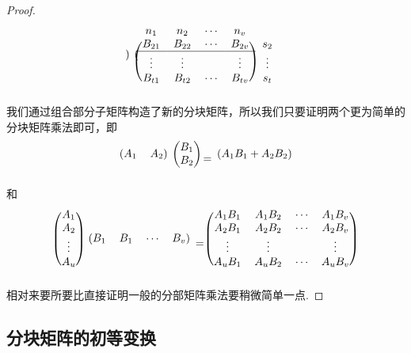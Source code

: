 \documentclass{article}
\begin{document}
\begin{proof}
$$\begin{array}{ll}
\begin{blockarray}{cccc}
\begin{block}{c(c|cc)}
\end{block} 
\end{blockarray}~
\begin{blockarray}{ccccc}
n_1    & n_2    & \cdots & n_v  &\\
\begin{block}{(cccc)c}
B_{21} & B_{22} & \cdots & B_{2v} & s_2 \\
\BAhhline{----}
\vdots & \vdots & 		 & \vdots & \vdots \\
B_{t1} & B_{t2} & \cdots & B_{tv} & s_t \\
\end{block}
\end{blockarray}
\end{array}
$$
我们通过组合部分子矩阵构造了新的分块矩阵，所以我们只要证明两个更为简单的分块矩阵乘法即可，即
$$
\begin{blockarray}{(cc)}
A_1 & A_2
\end{blockarray} ~
\begin{blockarray}{(c)}
B_1 \\
B_2 \\
\end{blockarray}
= \begin{blockarray}{(c)}
A_1B_1 + A_2B_2
\end{blockarray}
$$
和
$$
\begin{blockarray}{(c)}
A_{1} \\
A_{2} \\
\vdots \\
A_{u} \\
\end{blockarray} ~
\begin{blockarray}{(cccc)}
B_{1} & B_{1} & \cdots & B_{v} 
\end{blockarray} = 
\begin{blockarray}{(cccc)}
A_{1}B_1 & A_{1}B_{2} & \cdots & A_{1}B_{v} \\
A_{2}B_1 & A_{2}B_{2} & \cdots & A_{2}B_{v} \\
\vdots & \vdots &  & \vdots \\
A_{u}B_1 & A_{u}B_{2} & \cdots & A_{u}B_{v} \\
\end{blockarray}
$$
相对来要所要比直接证明一般的分部矩阵乘法要稍微简单一点. 
\end{proof}

\newpage
\subsection{分块矩阵的初等变换}
\end{document}
